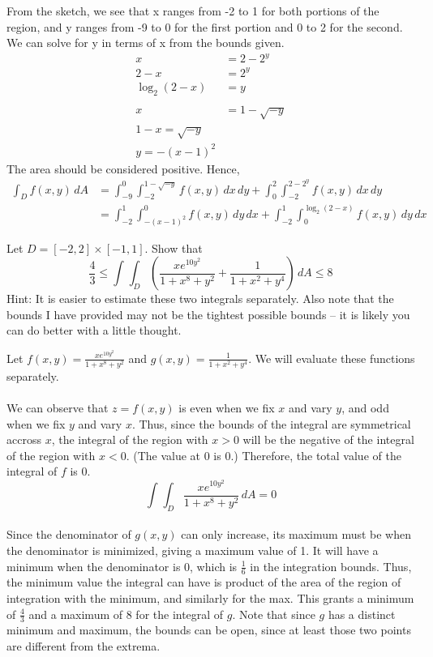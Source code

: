 \documentclass[12pt]{exam}
\begin{document}
\begin{questions}
\begin{solution}
\begin{center}
        \end{center}
        From the sketch, we see that x ranges from -2 to 1 for both portions of the region, and y ranges from -9 to 0 for the first portion and 0 to 2 for the second. We can solve for y in terms of x from the bounds given.
        \begin{align*}
            x &= 2 - 2^y \\
            2 - x &= 2 ^ y \\
            \log_2(2 - x) &= y \\\\
            x &= 1 - \sqrt{-y} \\
            1 - x = \sqrt{-y} \\
            y = -(x - 1)^2 
        \end{align*}
        The area should be considered positive. Hence, 
        \begin{align*}
            \int_{D}f(x, y)\,dA &= \int_{-9}^{0}\int_{-2}^{1-\sqrt{-y}}f(x, y)\, dx\, dy + \int_{0}^{2}\int_{-2}^{2-2^y}f(x, y)\, dx\, dy \\
            &= \boxed{\int_{-2}^{1}\int_{-(x - 1)^2}^{0}f(x, y)\, dy\, dx + \int_{-2}^{1}\int_{0}^{\log_2(2 - x)}f(x, y)\, dy\, dx} \tag*{\qed}
        \end{align*}
    \end{solution}
\clearpage
\question Let $D = [-2, 2] \times [-1, 1]$. Show that
\[ \frac{4}{3} \leq \int_{}^{} \int_{D}^{} \left(\frac{xe^{10y^2}}{1+ x^8 + y^2} + \frac{1}{1 + x^2 + y^4} \right)\, dA \leq 8\] 
Hint: It is easier to estimate these two integrals separately. Also note that the bounds I have provided may not be the tightest possible bounds -- it is likely you can do better with a little thought.
    \begin{solution}
        Let $f(x, y) = \frac{xe^{10y^2}}{1+ x^8 + y^2}$ and $g(x, y) = \frac{1}{1 + x^2 + y^4}$. We will evaluate these functions separately.\\\\
        We can observe that $z = f(x, y)$ is even when we fix $x$ and vary $y$, and odd when we fix $y$ and vary $x$. Thus, since the bounds of the integral are symmetrical accross $x$, the integral of the region with $x>0$ will be the negative of the integral of the region with $x<0$. (The value at 0 is 0.) Therefore, the total value of the integral of $f$ is 0.\[ \int_{}^{} \int_{D}^{} \frac{xe^{10y^2}}{1+ x^8 + y^2}\, dA = 0\] \\
        Since the denominator of $g(x, y)$ can only increase, its maximum must be when the denominator is minimized, giving a maximum value of 1. It will have a minimum when the denominator is 0, which is $\frac{1}{6}$ in the integration bounds. Thus, the minimum value the integral can have is product of the area of the region of integration with the minimum, and similarly for the max. This grants a minimum of $\frac{4}{3}$ and a maximum of 8 for the integral of $g$. Note that since $g$ has a distinct minimum and maximum, the bounds can be open, since at least those two points are different from the extrema. 

\end{solution}
\end{questions}
\end{document}
